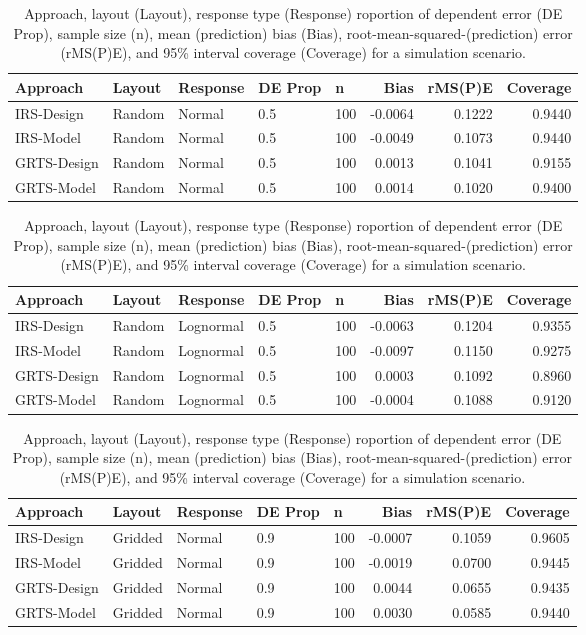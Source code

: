 \documentclass[]{elsarticle} %
\begin{document}
\begin{table}[ht]
\centering
\begin{tabular}{lllllrrr}
  \hline
Approach & Layout & Response & DE Prop & n & Bias & rMS(P)E & Coverage \\ 
  \hline
IRS-Design & Random & Normal & 0.5 & 100 & -0.0064 & 0.1222 & 0.9440 \\ 
  IRS-Model & Random & Normal & 0.5 & 100 & -0.0049 & 0.1073 & 0.9440 \\ 
  GRTS-Design & Random & Normal & 0.5 & 100 & 0.0013 & 0.1041 & 0.9155 \\ 
  GRTS-Model & Random & Normal & 0.5 & 100 & 0.0014 & 0.1020 & 0.9400 \\ 
   \hline
\end{tabular}
\caption{Approach, layout (Layout), response type (Response) roportion of dependent error (DE Prop), sample size (n), mean (prediction) bias (Bias), root-mean-squared-(prediction) error (rMS(P)E), and 95\% interval coverage (Coverage) for a simulation scenario.} 
\end{table}
\begin{table}[ht]
\centering
\begin{tabular}{lllllrrr}
  \hline
Approach & Layout & Response & DE Prop & n & Bias & rMS(P)E & Coverage \\ 
  \hline
IRS-Design & Random & Lognormal & 0.5 & 100 & -0.0063 & 0.1204 & 0.9355 \\ 
  IRS-Model & Random & Lognormal & 0.5 & 100 & -0.0097 & 0.1150 & 0.9275 \\ 
  GRTS-Design & Random & Lognormal & 0.5 & 100 & 0.0003 & 0.1092 & 0.8960 \\ 
  GRTS-Model & Random & Lognormal & 0.5 & 100 & -0.0004 & 0.1088 & 0.9120 \\ 
   \hline
\end{tabular}
\caption{Approach, layout (Layout), response type (Response) roportion of dependent error (DE Prop), sample size (n), mean (prediction) bias (Bias), root-mean-squared-(prediction) error (rMS(P)E), and 95\% interval coverage (Coverage) for a simulation scenario.} 
\end{table}
\begin{table}[ht]
\centering
\begin{tabular}{lllllrrr}
  \hline
Approach & Layout & Response & DE Prop & n & Bias & rMS(P)E & Coverage \\ 
  \hline
IRS-Design & Gridded & Normal & 0.9 & 100 & -0.0007 & 0.1059 & 0.9605 \\ 
  IRS-Model & Gridded & Normal & 0.9 & 100 & -0.0019 & 0.0700 & 0.9445 \\ 
  GRTS-Design & Gridded & Normal & 0.9 & 100 & 0.0044 & 0.0655 & 0.9435 \\ 
  GRTS-Model & Gridded & Normal & 0.9 & 100 & 0.0030 & 0.0585 & 0.9440 \\ 
   \hline
\end{tabular}
\caption{Approach, layout (Layout), response type (Response) roportion of dependent error (DE Prop), sample size (n), mean (prediction) bias (Bias), root-mean-squared-(prediction) error (rMS(P)E), and 95\% interval coverage (Coverage) for a simulation scenario.} 
\end{table}
\end{document}

